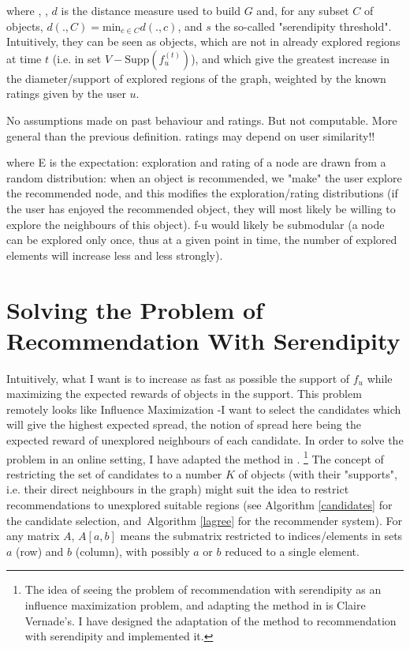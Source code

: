 \documentclass{article}
\begin{document}
where , , $d$ is the distance measure used to build $G$ and, for any subset $C$ of objects, $d(., C) = \text{min}_{c \in C} d(., c)$, and $s$ the so-called "serendipity threshold".\\

Intuitively, they can be seen as objects, which are not in already explored regions at time $t$ (i.e. in set $V - \text{Supp}(f^{(t)}_{u})$), and which give the greatest increase in the diameter/support of explored regions of the graph, weighted by the known ratings given by the user $u$.

No assumptions made on past behaviour and ratings. But not computable. More general than the previous definition. ratings may depend on user similarity!!

where E is the expectation: exploration and rating of a node are drawn from a random distribution: when an object is recommended, we "make" the user explore the recommended node, and this modifies the exploration/rating distributions (if the user has enjoyed the recommended object, they will most likely be willing to explore the neighbours of this object).
f-u would likely be submodular (a node can be explored only once, thus at a given point in time, the number of explored elements will increase less and less strongly).

\section{Solving the Problem of Recommendation With Serendipity}

Intuitively, what I want is to increase as fast as possible the support of $f_{u}$ while maximizing the expected rewards of objects in the support. This problem remotely looks like Influence Maximization -I want to select the candidates which will give the highest expected spread, the notion of spread here being the expected reward of unexplored neighbours of each candidate. In order to solve the problem in an online setting, I have adapted the method in \cite{lagree2017effective}. \footnote{The idea of seeing the problem of recommendation with serendipity as an influence maximization problem, and adapting the method in \cite{lagree2017effective} is Claire Vernade's. I have designed the adaptation of the method to recommendation with serendipity and implemented it.} The concept of restricting the set of candidates to a number $K$ of objects (with their "supports", i.e. their direct neighbours in the graph) might suit the idea to restrict recommendations to unexplored suitable regions (see Algorithm \ref{candidates} for the candidate selection, and Algorithm \ref{lagree} for the recommender system). For any matrix $A$, $A[a, b]$ means the submatrix restricted to indices/elements in sets $a$ (row) and $b$ (column), with possibly $a$ or $b$ reduced to a single element.
\end{document}
